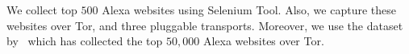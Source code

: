 We collect top $500$ Alexa websites using Selenium Tool. Also, we capture these websites over Tor, and three pluggable transports. Moreover, we use 
the dataset by~\cite{deepcore} which has collected the top $50,000$ Alexa websites over Tor. 

